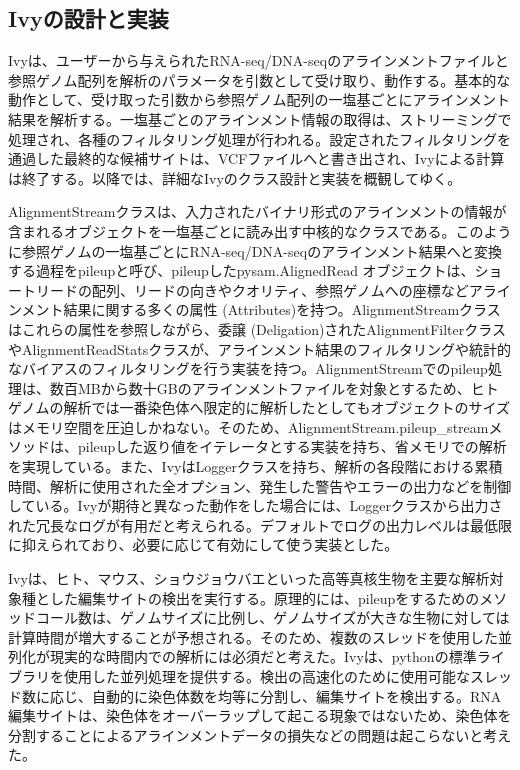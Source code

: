 \subsection{Ivyの設計と実装}
Ivyは、ユーザーから与えられたRNA-seq/DNA-seqのアラインメントファイルと参照ゲノム配列を解析のパラメータを引数として受け取り、動作する。基本的な動作として、受け取った引数から参照ゲノム配列の一塩基ごとにアラインメント結果を解析する。一塩基ごとのアラインメント情報の取得は、ストリーミングで処理され、各種のフィルタリング処理が行われる。設定されたフィルタリングを通過した最終的な候補サイトは、VCFファイルへと書き出され、Ivyによる計算は終了する。以降では、詳細なIvyのクラス設計と実装を概観してゆく。
\par
AlignmentStreamクラスは、入力されたバイナリ形式のアラインメントの情報が含まれるオブジェクトを一塩基ごとに読み出す中核的なクラスである。このように参照ゲノムの一塩基ごとにRNA-seq/DNA-seqのアラインメント結果へと変換する過程をpileupと呼び、pileupしたpysam.AlignedRead
オブジェクトは、ショートリードの配列、リードの向きやクオリティ、参照ゲノムへの座標などアラインメント結果に関する多くの属性 (Attributes)を持つ。AlignmentStreamクラスはこれらの属性を参照しながら、委譲 (Deligation)されたAlignmentFilterクラスやAlignmentReadStatsクラスが、アラインメント結果のフィルタリングや統計的なバイアスのフィルタリングを行う実装を持つ。AlignmentStreamでのpileup処理は、数百MBから数十GBのアラインメントファイルを対象とするため、ヒトゲノムの解析では一番染色体へ限定的に解析したとしてもオブジェクトのサイズはメモリ空間を圧迫しかねない。そのため、AlignmentStream.pileup\_streamメソッドは、pileupした返り値をイテレータとする実装を持ち、省メモリでの解析を実現している。また、IvyはLoggerクラスを持ち、解析の各段階における累積時間、解析に使用された全オプション、発生した警告やエラーの出力などを制御している。Ivyが期待と異なった動作をした場合には、Loggerクラスから出力された冗長なログが有用だと考えられる。デフォルトでログの出力レベルは最低限に抑えられており、必要に応じて有効にして使う実装とした。
\par
Ivyは、ヒト、マウス、ショウジョウバエといった高等真核生物を主要な解析対象種とした編集サイトの検出を実行する。原理的には、pileupをするためのメソッドコール数は、ゲノムサイズに比例し、ゲノムサイズが大きな生物に対しては計算時間が増大することが予想される。そのため、複数のスレッドを使用した並列化が現実的な時間内での解析には必須だと考えた。Ivyは、pythonの標準ライブラリを使用した並列処理を提供する。検出の高速化のために使用可能なスレッド数に応じ、自動的に染色体数を均等に分割し、編集サイトを検出する。RNA編集サイトは、染色体をオーバーラップして起こる現象ではないため、染色体を分割することによるアラインメントデータの損失などの問題は起こらないと考えた。

